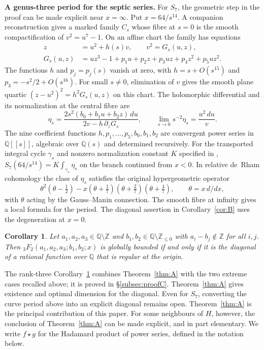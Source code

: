 \documentclass[11pt]{amsart}
\newtheorem{maincor}[mainthm]{Corollary}
\theoremstyle{definition}
\theoremstyle{remark}
\numberwithin{equation}{section}
\newcommand{\Q}{\mathbb{Q}}
\newcommand{\Z}{\mathbb{Z}}
\begin{document}
\smallskip
\noindent\textbf{A genus-three period for the septic series.}
For $S_7$, the geometric step in the proof can be made explicit near $x=\infty$.
Put $x=64/s^{14}$. A companion reconstruction
\citep[\S\S1--5]{SepticReconstruction} gives a marked family $C_s$ whose fibre
at $s=0$ is the smooth compactification of $v^2=u^7-1$. On an affine chart
the family has equations
\begin{equation}\label{eq:septic-local-curve}
\begin{aligned}
 z&=u^2+h(s)v,\qquad v^2=G_s(u,z),\\
 G_s(u,z)&=uz^3-1+p_1u+p_2z+p_3uz+p_4z^2+p_5uz^2.
\end{aligned}
\end{equation}
The functions $h$ and $p_j=p_j(s)$ vanish at zero, with
$h=s+O(s^{15})$ and $p_3=-s^2/2+O(s^{16})$.
For small $s\ne0$, elimination of $v$ gives the smooth plane quartic
$(z-u^2)^2=h^2G_s(u,z)$ on this chart.
The holomorphic differential and its normalization at the central fibre are
\[
 \eta_s=\frac{2s^2(b_0+b_1u+b_2z)\,du}{2v-h\,\partial_zG_s},
 \qquad \lim_{s\to0}s^{-2}\eta_s=\frac{u^2\,du}{v}.
\]
The nine coefficient functions $h,p_1,\ldots,p_5,b_0,b_1,b_2$ are convergent
power series in $\Q[[s]]$, algebraic over $\Q(s)$ and determined recursively.
For the transported integral cycle $\gamma_s$ and nonzero normalization
constant $K$ specified in \citep[\S3]{SepticReconstruction},
$S_7(64/s^{14})=K\int_{\gamma_s}\eta_s$ on the branch continued from $x<0$.
In relative de~Rham cohomology the class of $\eta_s$ satisfies the original
hypergeometric operator
\[
 \theta^2(\theta-\tfrac12)-x(\theta+\tfrac17)(\theta+\tfrac27)(\theta+\tfrac47),
 \qquad \theta=x\,d/dx,
\]
with $\theta$ acting by the Gauss--Manin connection. The smooth fibre at infinity
gives a local formula for the period. The diagonal assertion in
Corollary~\ref{cor:B} uses the degeneration at $x=0$.

\begin{maincor}\label{cor:C}
Let $a_1,a_2,a_3\in\Q\setminus\Z$ and $b_1,b_2\in\Q\setminus\Z_{\le0}$ with $a_i-b_j\notin\Z$ for all $i,j$. Then ${}_3F_2(a_1,a_2,a_3;b_1,b_2;x)$ is globally bounded if and only if it is the diagonal of a rational function over $\Q$ that is regular at the origin.
\end{maincor}

The rank-three Corollary~\ref{cor:C} combines Theorem~\ref{thm:A} with the two extreme cases recalled above; it is proved in \S\ref{subsec:proofC}. Theorem~\ref{thm:A} gives existence and optimal dimension for the diagonal. Even for $S_7$, converting the curve period above into an explicit diagonal remains open. Theorem~\ref{thm:A} is the principal contribution of this paper. For some neighbours of $H$, however, the conclusion of Theorem~\ref{thm:A} can be made explicit, and in part elementary. We write $f\star g$ for the Hadamard product of power series, defined in the notation below.
\end{document}
